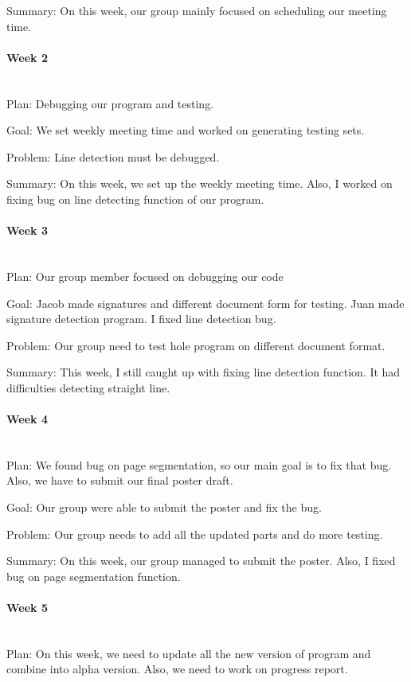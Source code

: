 \documentclass[article, onecolumn, draftclsnofoot,10pt, compsoc]{IEEEtran}
\begin{document}
Summary: On this week, our group mainly focused on scheduling our meeting time.

\paragraph{Week 2}
\mbox{}\\
Plan: Debugging our program and testing.

Goal: We set weekly meeting time and worked on generating testing sets.

Problem: Line detection must be debugged.

Summary: On this week, we set up the weekly meeting time. Also, I worked on fixing bug on line detecting function of our program.

\paragraph{Week 3}
\mbox{}\\
Plan: Our group member focused on debugging our code

Goal: Jacob made signatures and different document form for testing. Juan made signature detection program. I fixed line detection bug.

Problem: Our group need to test hole program on different document format.

Summary: This week, I still caught up with fixing line detection function. It had difficulties detecting straight line.

\paragraph{Week 4}
\mbox{}\\
Plan: We found bug on page segmentation, so our main goal is to fix that bug. Also, we have to submit our final poster draft.

Goal: Our group were able to submit the poster and fix the bug.

Problem: Our group needs to add all the updated parts and do more testing.

Summary: On this week, our group managed to submit the poster. Also, I fixed bug on page segmentation function.

\paragraph{Week 5}
\mbox{}\\
Plan: On this week, we need to update all the new version of program and combine into alpha version. Also, we need to work on progress report.
\end{document}

